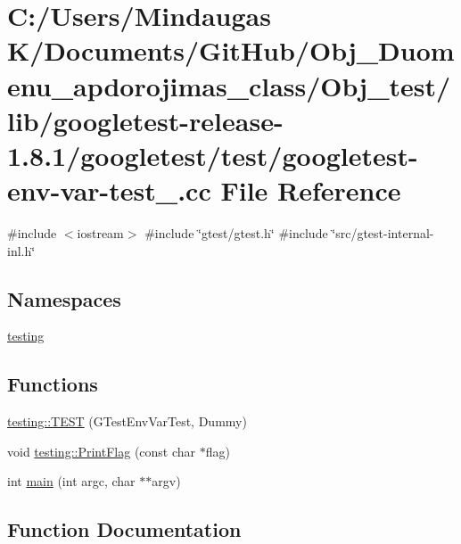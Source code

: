 \hypertarget{_obj__test_2lib_2googletest-release-1_88_81_2googletest_2test_2googletest-env-var-test___8cc}{}\section{C\+:/\+Users/\+Mindaugas K/\+Documents/\+Git\+Hub/\+Obj\+\_\+\+Duomenu\+\_\+apdorojimas\+\_\+class/\+Obj\+\_\+test/lib/googletest-\/release-\/1.8.1/googletest/test/googletest-\/env-\/var-\/test\+\_\+.cc File Reference}
\label{_obj__test_2lib_2googletest-release-1_88_81_2googletest_2test_2googletest-env-var-test___8cc}
{\ttfamily \#include $<$iostream$>$}\newline
{\ttfamily \#include \char`\"{}gtest/gtest.\+h\char`\"{}}\newline
{\ttfamily \#include \char`\"{}src/gtest-\/internal-\/inl.\+h\char`\"{}}\newline
\subsection*{Namespaces}
\begin{DoxyCompactItemize}
\item 
 \mbox{\hyperlink{namespacetesting}{testing}}
\end{DoxyCompactItemize}
\subsection*{Functions}
\begin{DoxyCompactItemize}
\item 
\mbox{\hyperlink{namespacetesting_af4187d1b48a2812f1335721ed8f30a99}{testing\+::\+T\+E\+ST}} (G\+Test\+Env\+Var\+Test, Dummy)
\item 
void \mbox{\hyperlink{namespacetesting_a9863402455bfcf9be5fc0b1453a6d97d}{testing\+::\+Print\+Flag}} (const char $\ast$flag)
\item 
int \mbox{\hyperlink{_obj__test_2lib_2googletest-release-1_88_81_2googletest_2test_2googletest-env-var-test___8cc_a3c04138a5bfe5d72780bb7e82a18e627}{main}} (int argc, char $\ast$$\ast$argv)
\end{DoxyCompactItemize}


\subsection{Function Documentation}
\mbox{\label{_obj__test_2lib_2googletest-release-1_88_81_2googletest_2test_2googletest-env-var-test___8cc_a3c04138a5bfe5d72780bb7e82a18e627}} 
